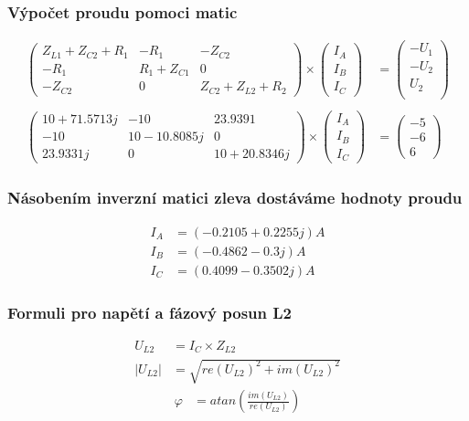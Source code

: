 \subsubsection{Výpočet proudu pomoci matic}
\centering
\begin{align*}
    \begin{pmatrix}
    Z_{L1} + Z_{C2} + R_1 & -R_1 & -Z_{C2}\\
    -R_1 & R_1 + Z_{C1} & 0\\
    -Z_{C2} & 0 & Z_{C2} + Z_{L2} + R_2
    \end{pmatrix}
    \times
    \begin{pmatrix}
    I_A\\
    I_B\\
    I_C
    \end{pmatrix}
    &=
    \begin{pmatrix}
    -U_1\\
    -U_2\\
    U_2\\
    \end{pmatrix}
    \\ \\
    \begin{pmatrix}
    10 + 71.5713j & -10 & 23.9391\\
    -10 & 10 - 10.8085j & 0\\
    23.9331j & 0 & 10 + 20.8346j
    \end{pmatrix}
    \times
    \begin{pmatrix}
    I_A\\
    I_B\\
    I_C
    \end{pmatrix}
    &=
    \begin{pmatrix}
    -5\\
    -6\\
    6
    \end{pmatrix}
\end{align*}
\subsubsection{Násobením inverzní matici zleva dostáváme hodnoty proudu}
\begin{align*}
I_A &= (-0.2105 + 0.2255j) A\\
I_B &= (-0.4862 - 0.3j) A\\
I_C &= (0.4099 - 0.3502j) A
\end{align*}
\subsubsection{Formuli pro napětí a fázový posun L2}
\begin{align*}
U_{L2} &= I_C \times Z_{L2}\\
\vert U_{L2}\vert &= \sqrt{ re(U_{L2})^2 + im(U_{L2})^2 }
\end{align*}
\begin{align*}
\varphi &= atan(\frac {im(U_{L2})}{re(U_{L2})})
\end{align*}
\centering

